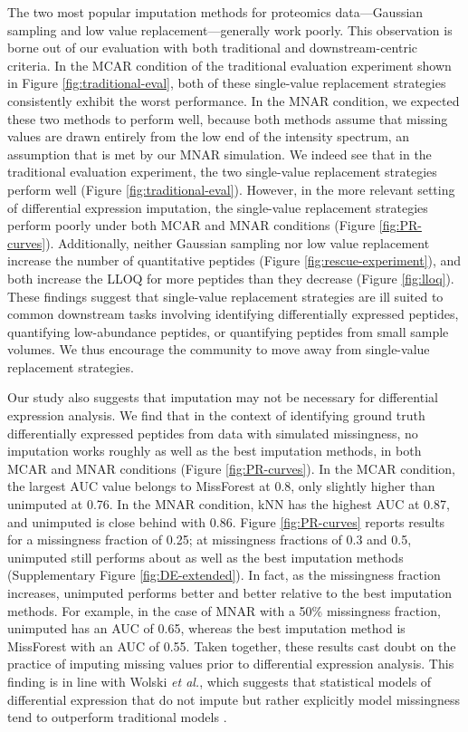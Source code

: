 \documentclass{article}
\begin{document}
The two most popular imputation methods for proteomics data---Gaussian sampling and low value replacement---generally work poorly. This observation is borne out of our evaluation with both traditional and downstream-centric criteria. In the MCAR condition of the traditional evaluation experiment shown in Figure \ref{fig:traditional-eval}, both of these single-value replacement strategies consistently exhibit the worst performance. In the MNAR condition, we expected these two methods to perform well, because both methods assume that missing values are drawn entirely from the low end of the intensity spectrum, an assumption that is met by our MNAR simulation. We indeed see that in the traditional evaluation experiment, the two single-value replacement strategies perform well (Figure \ref{fig:traditional-eval}). However, in the more relevant setting of differential expression imputation, the single-value replacement strategies perform poorly under both MCAR and MNAR conditions (Figure \ref{fig:PR-curves}). Additionally, neither Gaussian sampling nor low value replacement increase the number of quantitative peptides (Figure \ref{fig:rescue-experiment}), and both increase the LLOQ for more peptides than they decrease (Figure \ref{fig:lloq}). These findings suggest that single-value replacement strategies are ill suited to common downstream tasks involving identifying differentially expressed peptides, quantifying low-abundance peptides, or quantifying peptides from small sample volumes. We thus encourage the community to move away from single-value replacement strategies.

Our study also suggests that imputation may not be necessary for differential expression analysis. 
We find that in the context of identifying ground truth differentially expressed peptides from data with simulated missingness, no imputation works roughly as well as the best imputation methods, in both MCAR and MNAR conditions (Figure \ref{fig:PR-curves}). In the MCAR condition, the largest AUC value belongs to MissForest at 0.8, only slightly higher than unimputed at 0.76. In the MNAR condition, kNN has the highest AUC at 0.87, and unimputed is close behind with 0.86. Figure \ref{fig:PR-curves} reports results for a missingness fraction of 0.25; at missingness fractions of 0.3 and 0.5, unimputed still performs about as well as the best imputation methods (Supplementary Figure \ref{fig:DE-extended}). In fact, as the missingness fraction increases, unimputed performs better and better relative to the best imputation methods.  For example, in the case of MNAR with a 50\% missingness fraction, unimputed has an AUC of 0.65, whereas the best imputation method is MissForest with an AUC of 0.55. Taken together, these results cast doubt on the practice of imputing missing values prior to differential expression analysis. This finding is in line with Wolski \textit{et al.}, which suggests that statistical models of differential expression that do not impute but rather explicitly model missingness tend to outperform traditional models \cite{prolfqua}.
\end{document}
